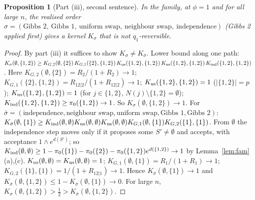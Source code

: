 \documentclass[11pt]{article}
\newtheorem{proposition}[theorem]{Proposition}
\theoremstyle{remark}
\begin{document}
\begin{proposition}[Part (iii), second sentence]\label{prop:nonrev}
In the family, at $\phi=1$ and for all large $n$, the realised order $\sigma=(\text{Gibbs }2,\ \text{Gibbs }1,\ \text{uniform swap},\ \text{neighbour swap},\ \text{independence})$ (Gibbs 2 applied first) gives a kernel $K_\sigma$ that is not $q_1$-reversible.
\end{proposition}
\begin{proof}
By part (iii) it suffices to show $K_\sigma\ne K_{\bar\sigma}$. Lower bound along one path:
$K_\sigma(\emptyset,\{1,2\})\ge K_{G,2}(\emptyset,\{2\})\,K_{G,1}(\{2\},\{1,2\})\,K_{\rm us}(\{1,2\},\{1,2\})\,K_{\rm ns}(\{1,2\},\{1,2\})\,K_{\rm ind}(\{1,2\},\{1,2\})$.
Here $K_{G,2}(\emptyset,\{2\})=R_2/(1+R_2)\to1$; $K_{G,1}(\{2\},\{1,2\})=R_{12|2}/(1+R_{12|2})\to1$; $K_{\rm us}(\{1,2\},\{1,2\})=1$ ($|\{1,2\}|=p$); $K_{\rm ns}(\{1,2\},\{1,2\})=1$ (for $j\in\{1,2\}$, $N(j)\setminus\{1,2\}=\emptyset$); $K_{\rm ind}(\{1,2\},\{1,2\})\ge\pi_0(\{1,2\})\to1$. So $K_\sigma(\emptyset,\{1,2\})\to1$.
For $\bar\sigma=(\text{independence},\text{neighbour swap},\text{uniform swap},\text{Gibbs }1,\text{Gibbs }2)$:
$K_{\bar\sigma}(\emptyset,\{1\})\ge K_{\rm ind}(\emptyset,\emptyset)K_{\rm ns}(\emptyset,\emptyset)K_{\rm us}(\emptyset,\emptyset)K_{G,1}(\emptyset,\{1\})K_{G,2}(\{1\},\{1\})$. From $\emptyset$ the independence step moves only if it proposes some $S'\ne\emptyset$ and accepts, with acceptance $1\wedge e^{d(S')}$; so $K_{\rm ind}(\emptyset,\emptyset)\ge1-\pi_0(\{1\})-\pi_0(\{2\})-\pi_0(\{1,2\})e^{d(\{1,2\})}\to1$ by Lemma~\ref{lem:fam}(a),(c). $K_{\rm ns}(\emptyset,\emptyset)=K_{\rm us}(\emptyset,\emptyset)=1$; $K_{G,1}(\emptyset,\{1\})=R_1/(1+R_1)\to1$; $K_{G,2}(\{1\},\{1\})=1/(1+R_{12|1})\to1$. Hence $K_{\bar\sigma}(\emptyset,\{1\})\to1$ and $K_{\bar\sigma}(\emptyset,\{1,2\})\le1-K_{\bar\sigma}(\emptyset,\{1\})\to0$. For large $n$, $K_\sigma(\emptyset,\{1,2\})>\tfrac12>K_{\bar\sigma}(\emptyset,\{1,2\})$.
\end{proof}
\end{document}
